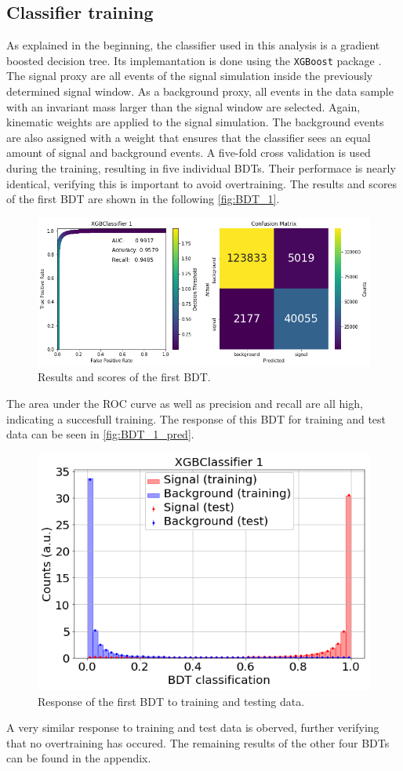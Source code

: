 \subsection{Classifier training}
As explained in the beginning, the classifier used in this analysis is a gradient boosted decision tree. Its implemantation is done using the \texttt{XGBoost} package \cite{XGBoost}.
The signal proxy are all events of the signal simulation inside the previously determined signal window. As a background proxy, all events in the data sample with an invariant mass
larger than the signal window are selected. Again, kinematic weights are applied to the signal simulation. The background events are also assigned with a weight that ensures that the
classifier sees an equal amount of signal and background events.
A five-fold cross validation is used during the training, resulting in five individual BDTs. Their performace is nearly identical, verifying this is important to avoid overtraining.
The results and scores of the first BDT are shown in the following \autoref{fig:BDT_1}.
\begin{figure}[H]
	\centering
	\includegraphics[width=0.8\linewidth]{plots/BDT_1.png}
	\caption{Results and scores of the first BDT.}
	\label{fig:BDT_1}
\end{figure}
The area under the ROC curve as well as precision and recall are all high, indicating a succesfull training.
The response of this BDT for training and test data can be seen in \autoref{fig:BDT_1_pred}.
\begin{figure}[H]
	\centering
	\includegraphics[width=0.5\linewidth]{plots/BDT1_pred.png}
	\caption{Response of the first BDT to training and testing data.}
	\label{fig:BDT_1_pred}
\end{figure}
A very similar response to training and test data is oberved, further verifying that no overtraining has occured.
The remaining results of the other four BDTs can be found in the appendix.

